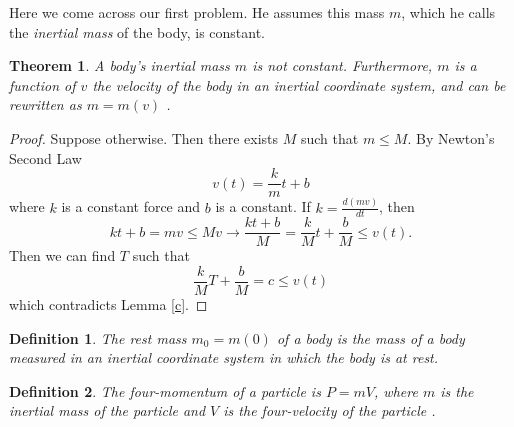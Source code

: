 \documentclass[12pt]{article}
\newtheorem{thm}{Theorem}
\theoremstyle{defn}
\newtheorem{defn}{Definition}
\theoremstyle{pf}
\newcommand{\0}{\emptyset}
\renewcommand{\-}{\setminus}
\begin{document}
Here we come across our first problem. He assumes this mass $m$, which he calls the \textit{inertial mass} of the body, is constant.

\begin{thm}A body's inertial mass $m$ is not constant. Furthermore, $m$ is a function of $v$ the velocity of the body in an inertial coordinate system, and can be rewritten as $m=m(v)$ \cite{callahan}.
\end{thm}
\begin{proof}
Suppose otherwise. Then there exists $M$ such that $m\leq M$. By Newton's Second Law $$v(t)=\dfrac{k}{m}t+b$$ where $k$ is a constant force and $b$ is a constant. If $k=\frac{d(mv)}{dt}$, then $$kt+b=mv\leq Mv \rightarrow \dfrac{kt+b}{M}=\dfrac{k}{M}t+\dfrac{b}{M}\leq v(t).$$ Then we can find $T$ such that $$\dfrac{k}{M}T+\dfrac{b}{M}=c\leq v(t)$$ which contradicts Lemma \ref{c}.
\end{proof}

\begin{defn}
 The \textit{rest mass} $m_0=m(0)$ of a body is the mass of a body measured in an inertial coordinate system in which the body is at rest. 
\end{defn}

\begin{defn}The \textit{four-momentum} of a particle  is $P=mV$, where $m$ is the inertial mass of the particle and $V$ is the four-velocity of the particle \cite{woodhouse}.
\end{defn}
\end{document}
